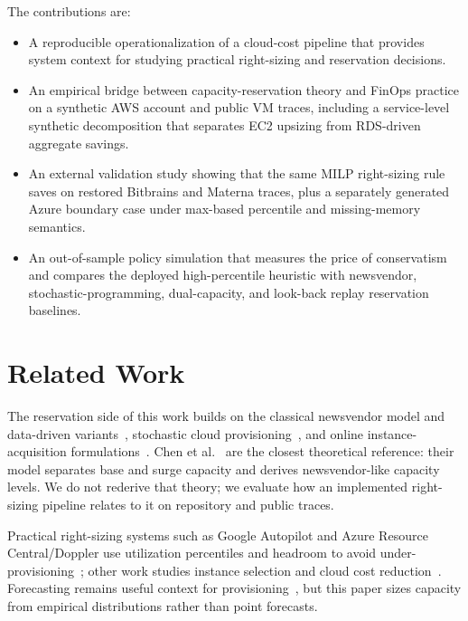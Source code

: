 \documentclass[conference]{IEEEtran}
\begin{document}
The contributions are:
\begin{itemize}
\item A reproducible operationalization of a cloud-cost pipeline that provides
system context for studying practical right-sizing and reservation decisions.
\item An empirical bridge between capacity-reservation theory and FinOps
practice on a synthetic AWS account and public VM traces, including a
service-level synthetic decomposition that separates EC2 upsizing from
RDS-driven aggregate savings.
\item An external validation study showing that the same MILP right-sizing
rule saves on restored Bitbrains and Materna traces, plus a separately
generated Azure boundary case under max-based percentile and missing-memory
semantics.
\item An out-of-sample policy simulation that measures the price of
conservatism and compares the deployed high-percentile heuristic with
newsvendor, stochastic-programming, dual-capacity, and look-back replay
reservation baselines.
\end{itemize}

\section{Related Work}

The reservation side of this work builds on the classical newsvendor model and
data-driven variants~\cite{arrow1951inventory,ban2019newsvendor}, stochastic
cloud provisioning~\cite{chaisiri2012provisioning,bulbul2021provisioning}, and
online instance-acquisition formulations~\cite{wang2014optimal,wang2014dynamic}.
Chen et al.~\cite{chen2024capacity} are the closest theoretical reference:
their model separates base and surge capacity and derives newsvendor-like
capacity levels. We do not rederive that theory; we evaluate how an
implemented right-sizing pipeline relates to it on repository and public traces.

Practical right-sizing systems such as Google Autopilot and Azure Resource
Central/Doppler use utilization percentiles and headroom to avoid
under-provisioning~\cite{rzadca2020autopilot,cortez2017resource,cahoon2022doppler};
other work studies instance selection and cloud cost
reduction~\cite{yadwadkar2017paris,aydin2020binpacking,alves2025iaas,musa2024costeffective}.
Forecasting remains useful context for provisioning~\cite{taylor2018prophet,hyndman2008forecast,kirchoff2024provisioning,agullo2025forecasting},
but this paper sizes capacity from empirical distributions rather than point
forecasts.
\end{document}
